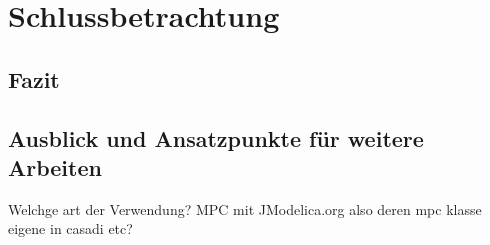 %
%

\renewcommand{\chapterheadstartvskip}{\vspace*{3cm}}

\chapter{Schlussbetrachtung}
\label{chap:schlussteil}
\renewcommand{\chapterheadstartvskip}{\vspace*{-0.5cm}}

\section{Fazit}
\label{sec:zusammenfassung}


\section{Ausblick und Ansatzpunkte für weitere Arbeiten}
\label{sec:ausblick}

Welchge art der Verwendung?
MPC mit JModelica.org also deren mpc klasse
eigene in casadi
etc?